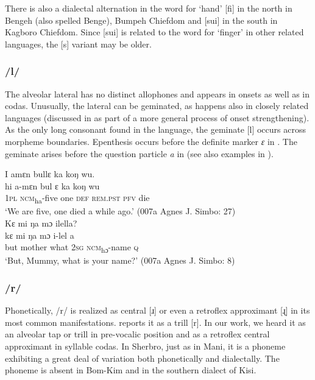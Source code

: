There is also a dialectal alternation in the word for ‘hand' [fi] in the north in Bengeh (also spelled Benge), Bumpeh Chiefdom  and [sui] in the south in Kagboro Chiefdom. Since [sui] is related to the word for ‘finger' in other related languages, the [s] variant may be older.

\subsubsection{/l/}
\label{sec:2.1.2.5}
The alveolar lateral has no distinct allophones and appears in onsets as well as in codas. Unusually, the lateral can be geminated, as happens also in closely related languages (discussed in  as part of a more general process of onset strengthening). As the only long consonant found in the language, the geminate [l] occurs across morpheme boundaries. Epenthesis occurs before the definite marker \textit{ɛ} in . The geminate arises before the question particle \textit{a} in  (see also examples in ).

\ea %
\label{ex:22}
\ea I amɛn bullɛ ka koŋ wu.\\
\gll hi    a-mɛn    bul  ɛ    ka        koŋ  wu\\
\textsc{1pl}  \textsc{ncm}\textsubscript{ha}{}-five  one  \textsc{def}  \textsc{rem.pst}    \textsc{pfv}  die\\
\glt ‘We are five, one died a while ago.' (007a Agnes J. Simbo: 27)\\
\ex Kɛ mi ŋa mɔ ilella?\\
\gll kɛ    mi      ŋa    mɔ  i-lel        a\\
but  mother  what  \textsc{2sg}  \textsc{ncm}\textsubscript{hɔ}{}-name  \textsc{q}\\
\glt ‘But, Mummy, what is your name?' (007a Agnes J. Simbo: 8)
\z
\z

\subsubsection{/r/}
\label{sec:2.1.2.6}
Phonetically, /r/ is realized as central [ɹ] or even a retroflex approximant [ɻ] in its most common manifestations. \citet{Pichl1967} reports it as a trill [r]. In our work, we heard it as an alveolar tap or trill in pre-vocalic position and as a retroflex central approximant in syllable codas. In Sherbro, just as in Mani, it is a phoneme exhibiting a great deal of variation both phonetically and dialectally. The phoneme is absent in Bom-Kim and in the southern dialect of Kisi.

